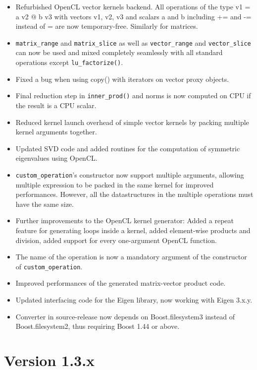 \begin{itemize}
 \item Refurbished OpenCL vector kernels backend.
       All operations of the type v1 = a v2 @ b v3 with vectors v1, v2, v3 and scalars a and b including += and -= instead of = are now temporary-free. Similarly for matrices.
 \item \lstinline|matrix_range| and \lstinline|matrix_slice| as well as \lstinline|vector_range| and \lstinline|vector_slice| can now be used and mixed completely seamlessly with all standard operations except \lstinline|lu_factorize()|.
 \item Fixed a bug when using copy() with iterators on vector proxy objects.
 \item Final reduction step in \lstinline|inner_prod()| and norms is now computed on CPU if the result is a CPU scalar.
 \item Reduced kernel launch overhead of simple vector kernels by packing multiple kernel arguments together.
 \item Updated SVD code and added routines for the computation of symmetric eigenvalues using OpenCL.
 \item \lstinline|custom_operation|'s constructor now support multiple arguments, allowing multiple expression to be packed in the same kernel for improved performances. However, all the datastructures in the multiple operations must have the same size.
 \item Further improvements to the OpenCL kernel generator: Added a repeat feature for generating loops inside a kernel,
       added element-wise products and division, added support for every one-argument OpenCL function.
 \item The name of the operation is now a mandatory argument of the constructor of \lstinline|custom_operation|.
 \item Improved performances of the generated matrix-vector product code.
 \item Updated interfacing code for the Eigen library, now working with Eigen 3.x.y.
 \item Converter in source-release now depends on Boost.filesystem3 instead of Boost.filesystem2, thus requiring Boost 1.44 or above.
\end{itemize}





\section*{Version 1.3.x}

